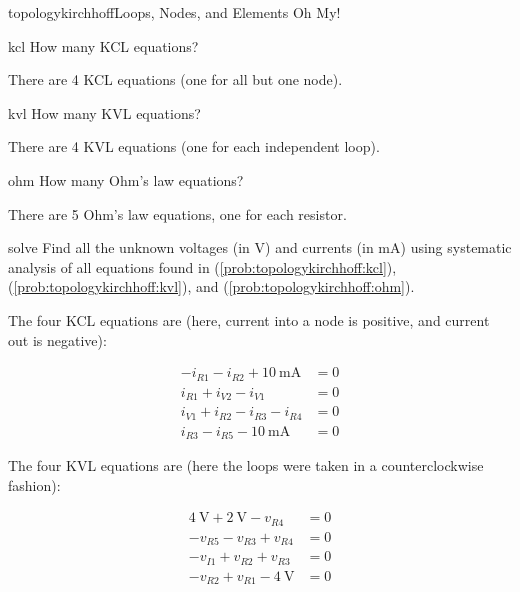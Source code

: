 \begin{mainquestion}{topologykirchhoff}{Loops, Nodes, and Elements Oh My!}
\begin{partquestion}{kcl}
{How many KCL equations?}
\begin{answer}
    There are 4 KCL equations (one for all but one node).
\end{answer}
\end{partquestion}

\begin{partquestion}{kvl}
{How many KVL equations?}
\begin{answer}
There are 4 KVL equations (one for each independent loop).
\end{answer}
\end{partquestion}

\begin{partquestion}{ohm}
{How many Ohm’s law equations?}
\begin{answer}
There are 5 Ohm’s law equations, one for each resistor.
\end{answer}
\end{partquestion}

\begin{partquestion}{solve}
{Find all the unknown voltages (in \unit{\volt}) and currents (in \unit{\milli\ampere}) using systematic analysis of all equations found in (\cref{prob:topologykirchhoff:kcl}), (\cref{prob:topologykirchhoff:kvl}), and (\cref{prob:topologykirchhoff:ohm}).}

\begin{answer}

The four KCL equations are (here, current into a node is positive, and current out is negative):

\begin{align}
-i_{R1}-i_{R2}+\qty{10}{\milli\ampere} &= 0 \\
i_{R1}+i_{V2}-i_{V1} &= 0 \\
i_{V1}+i_{R2}-i_{R3}-i_{R4} &= 0 \\
i_{R3}-i_{R5}-\qty{10}{\milli\ampere} &= 0
\end{align}

The four KVL equations are (here the loops were taken in a counterclockwise fashion):

\begin{align}
\qty{4}{\volt}+\qty{2}{\volt}-v_{R4} &= 0 \\
-v_{R5}-v_{R3}+v_{R4} &= 0 \\
-v_{I1}+v_{R2}+v_{R3} &= 0 \\
-v_{R2}+v_{R1}-\qty{4}{\volt} &= 0
\end{align}


\end{answer}
\end{partquestion}
\end{mainquestion}
